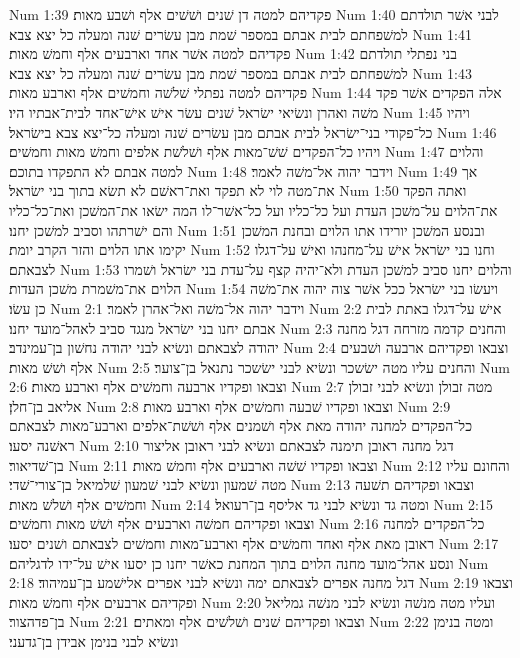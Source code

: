 Num 1:39  פקדיהם למטה דן שׁנים ושׁשׁים אלף ושׁבע מאות׃
Num 1:40  לבני אשׁר תולדתם למשׁפחתם לבית אבתם במספר שׁמת מבן עשׂרים שׁנה ומעלה כל יצא צבא׃
Num 1:41  פקדיהם למטה אשׁר אחד וארבעים אלף וחמשׁ מאות׃
Num 1:42  בני נפתלי תולדתם למשׁפחתם לבית אבתם במספר שׁמת מבן עשׂרים שׁנה ומעלה כל יצא צבא׃
Num 1:43  פקדיהם למטה נפתלי שׁלשׁה וחמשׁים אלף וארבע מאות׃
Num 1:44  אלה הפקדים אשׁר פקד משׁה ואהרן ונשׂיאי ישׂראל שׁנים עשׂר אישׁ אישׁ־אחד לבית־אבתיו היו׃
Num 1:45  ויהיו כל־פקודי בני־ישׂראל לבית אבתם מבן עשׂרים שׁנה ומעלה כל־יצא צבא בישׂראל׃
Num 1:46  ויהיו כל־הפקדים שׁשׁ־מאות אלף ושׁלשׁת אלפים וחמשׁ מאות וחמשׁים׃
Num 1:47  והלוים למטה אבתם לא התפקדו בתוכם׃
Num 1:48  וידבר יהוה אל־משׁה לאמר׃
Num 1:49  אך את־מטה לוי לא תפקד ואת־ראשׁם לא תשׂא בתוך בני ישׂראל׃
Num 1:50  ואתה הפקד את־הלוים על־משׁכן העדת ועל כל־כליו ועל כל־אשׁר־לו המה ישׂאו את־המשׁכן ואת־כל־כליו והם ישׁרתהו וסביב למשׁכן יחנו׃
Num 1:51  ובנסע המשׁכן יורידו אתו הלוים ובחנת המשׁכן יקימו אתו הלוים והזר הקרב יומת׃
Num 1:52  וחנו בני ישׂראל אישׁ על־מחנהו ואישׁ על־דגלו לצבאתם׃
Num 1:53  והלוים יחנו סביב למשׁכן העדת ולא־יהיה קצף על־עדת בני ישׂראל ושׁמרו הלוים את־משׁמרת משׁכן העדות׃
Num 1:54  ויעשׂו בני ישׂראל ככל אשׁר צוה יהוה את־משׁה כן עשׂו׃
Num 2:1  וידבר יהוה אל־משׁה ואל־אהרן לאמר׃
Num 2:2  אישׁ על־דגלו באתת לבית אבתם יחנו בני ישׂראל מנגד סביב לאהל־מועד יחנו׃
Num 2:3  והחנים קדמה מזרחה דגל מחנה יהודה לצבאתם ונשׂיא לבני יהודה נחשׁון בן־עמינדב׃
Num 2:4  וצבאו ופקדיהם ארבעה ושׁבעים אלף ושׁשׁ מאות׃
Num 2:5  והחנים עליו מטה ישׂשכר ונשׂיא לבני ישׂשכר נתנאל בן־צוער׃
Num 2:6  וצבאו ופקדיו ארבעה וחמשׁים אלף וארבע מאות׃
Num 2:7  מטה זבולן ונשׂיא לבני זבולן אליאב בן־חלן׃
Num 2:8  וצבאו ופקדיו שׁבעה וחמשׁים אלף וארבע מאות׃
Num 2:9  כל־הפקדים למחנה יהודה מאת אלף ושׁמנים אלף ושׁשׁת־אלפים וארבע־מאות לצבאתם ראשׁנה יסעו׃
Num 2:10  דגל מחנה ראובן תימנה לצבאתם ונשׂיא לבני ראובן אליצור בן־שׁדיאור׃
Num 2:11  וצבאו ופקדיו שׁשׁה וארבעים אלף וחמשׁ מאות׃
Num 2:12  והחונם עליו מטה שׁמעון ונשׂיא לבני שׁמעון שׁלמיאל בן־צורי־שׁדי׃
Num 2:13  וצבאו ופקדיהם תשׁעה וחמשׁים אלף ושׁלשׁ מאות׃
Num 2:14  ומטה גד ונשׂיא לבני גד אליסף בן־רעואל׃
Num 2:15  וצבאו ופקדיהם חמשׁה וארבעים אלף ושׁשׁ מאות וחמשׁים׃
Num 2:16  כל־הפקדים למחנה ראובן מאת אלף ואחד וחמשׁים אלף וארבע־מאות וחמשׁים לצבאתם ושׁנים יסעו׃
Num 2:17  ונסע אהל־מועד מחנה הלוים בתוך המחנת כאשׁר יחנו כן יסעו אישׁ על־ידו לדגליהם׃
Num 2:18  דגל מחנה אפרים לצבאתם ימה ונשׂיא לבני אפרים אלישׁמע בן־עמיהוד׃
Num 2:19  וצבאו ופקדיהם ארבעים אלף וחמשׁ מאות׃
Num 2:20  ועליו מטה מנשׁה ונשׂיא לבני מנשׁה גמליאל בן־פדהצור׃
Num 2:21  וצבאו ופקדיהם שׁנים ושׁלשׁים אלף ומאתים׃
Num 2:22  ומטה בנימן ונשׂיא לבני בנימן אבידן בן־גדעני׃
